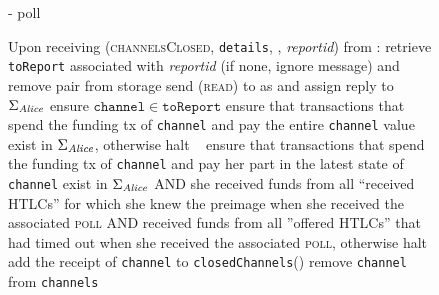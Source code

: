 \begin{figure}[H]
\begin{systembox}{\fpaynet - poll}
\begin{algorithmic}[1]
        \State {}
        \State Upon receiving (\textsc{channelsClosed}, \texttt{details},
        \alice, \textit{reportid}) from \simulator:
        \Indent
          \State retrieve \texttt{toReport} associated with \textit{reportid}
          (if none, ignore message) and remove pair from storage
          \State send (\textsc{read}) to \ledger{} as \alice{} and assign reply
          to $\Sigma_{\mathit{Alice}}$
            \State ensure $\mathtt{channel} \in \mathtt{toReport}$
              \State ensure that transactions that spend the funding tx of
              \texttt{channel} and pay \alice{} the entire \texttt{channel}
              value exist in $\Sigma_{\mathit{Alice}}$, otherwise halt
            \Else \ 
              \State ensure that transactions that spend the funding tx of
              \texttt{channel} and pay \alice{} her part in the latest state of
              \texttt{channel} exist in $\Sigma_{\mathit{Alice}}$ AND she received funds
              from all ``received HTLCs'' for which she knew the preimage when
              she received the associated \textsc{poll} AND received funds from
              all ''offered HTLCs'' that had timed out when she received the
              associated \textsc{poll}, otherwise halt
            \EndIf
            \State add the receipt of \texttt{channel} to
            \texttt{closedChannels}(\alice)
            \State remove \texttt{channel} from \texttt{channels}
          \EndFor
        \EndIndent
      \end{algorithmic}
    \end{systembox}
    \caption{}
    \label{alg:fpaynet:poll}
  \end{figure}

